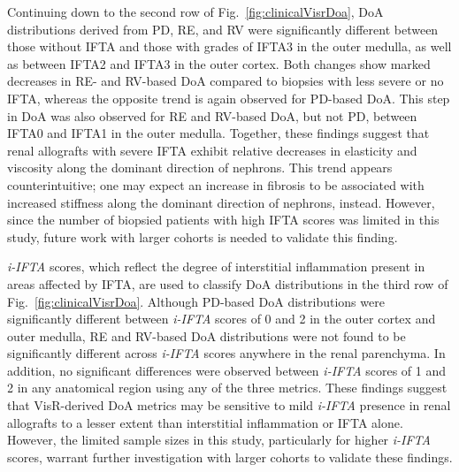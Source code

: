 Continuing down to the second row of Fig.~\ref{fig:clinicalVisrDoa}, DoA distributions derived from PD, RE, and RV were significantly different between those without IFTA and those with grades of IFTA3 in the outer medulla, as well as between IFTA2 and IFTA3 in the outer cortex. Both changes show marked decreases in RE- and RV-based DoA compared to biopsies with less severe or no IFTA, whereas the opposite trend is again observed for PD-based DoA. This step in DoA was also observed for RE and RV-based DoA, but not PD, between IFTA0 and IFTA1 in the outer medulla. Together, these findings suggest that renal allografts with severe IFTA exhibit relative decreases in elasticity and viscosity along the dominant direction of nephrons. This trend appears counterintuitive; one may expect an increase in fibrosis to be associated with increased stiffness along the dominant direction of nephrons, instead. However, since the number of biopsied patients with high IFTA scores was limited in this study, future work with larger cohorts is needed to validate this finding.

\emph{i-IFTA} scores, which reflect the degree of interstitial inflammation present in areas affected by IFTA, are used to classify DoA distributions in the third row of Fig.~\ref{fig:clinicalVisrDoa}. Although PD-based DoA distributions were significantly different between \emph{i-IFTA} scores of 0 and 2 in the outer cortex and outer medulla, RE and RV-based DoA distributions were not found to be significantly different across \emph{i-IFTA} scores anywhere in the renal parenchyma. In addition, no significant differences were observed between \emph{i-IFTA} scores of 1 and 2 in any anatomical region using any of the three metrics. These findings suggest that VisR-derived DoA metrics may be sensitive to mild \emph{i-IFTA} presence in renal allografts to a lesser extent than interstitial inflammation or IFTA alone. However, the limited sample sizes in this study, particularly for higher \emph{i-IFTA} scores, warrant further investigation with larger cohorts to validate these findings.

